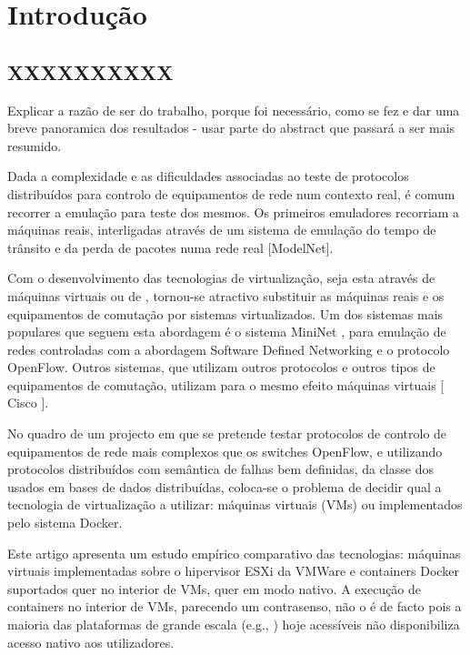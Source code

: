 
\section{Introdução}

\subsection{XXXXXXXXXX }

{ \color{blue} Explicar a razão de ser do trabalho, porque foi necessário, como se fez e dar uma
breve panoramica dos resultados - usar parte do abstract que passará a ser mais resumido.}



Dada a complexidade e as dificuldades associadas ao teste de
protocolos distribuídos para controlo de equipamentos de rede num
contexto real, é comum recorrer a emulação para teste dos mesmos. Os
primeiros emuladores recorriam a máquinas reais, interligadas através
de um sistema de emulação do tempo de trânsito e da perda de pacotes
numa rede real [ModelNet].

Com o desenvolvimento das tecnologias de virtualização, seja esta através de
máquinas virtuais ou de \conts, tornou-se atractivo substituir as
máquinas reais e os equipamentos de comutação por sistemas
virtualizados. Um dos sistemas mais populares que seguem esta
abordagem é o sistema MiniNet \cite{Lantz:2010:NLR:1868447.1868466}, para emulação de redes
controladas com a abordagem Software Defined Networking e o protocolo
OpenFlow. Outros sistemas, que utilizam outros protocolos e outros
tipos de equipamentos de comutação, utilizam para o mesmo efeito
máquinas virtuais [ Cisco ].

No quadro de um projecto em que se pretende testar protocolos de
controlo de equipamentos de rede mais complexos que os switches
OpenFlow, e utilizando protocolos distribuídos com semântica de falhas
bem definidas, da classe dos usados em bases de dados distribuídas,
coloca-se o problema de decidir qual a tecnologia de virtualização a
utilizar: máquinas virtuais (VMs) ou {\conts} implementados pelo sistema
Docker.

Este artigo apresenta um estudo empírico comparativo das tecnologias:
máquinas virtuais implementadas sobre o hipervisor 
ESXi da VMWare e containers Docker suportados quer no interior de VMs, quer em modo nativo.
A execução de containers no interior de VMs, parecendo um contrasenso, 
não o é de facto pois a maioria das plataformas de grande escala (e.g., \clouds)
hoje acessíveis não disponibiliza acesso nativo aos utilizadores.


